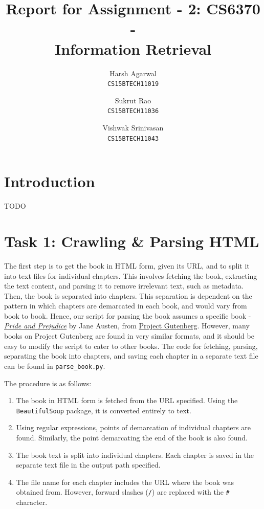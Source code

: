 \documentclass{article}
\title{Report for Assignment - 2: CS6370 - \\Information Retrieval}
\author{
Harsh Agarwal\\\texttt{CS15BTECH11019}
\and
Sukrut Rao\\\texttt{CS15BTECH11036}
\and
Vishwak Srinivasan\\\texttt{CS15BTECH11043}
}
\date{}
\begin{document}
\maketitle

\section{Introduction}
\begin{flushleft}
TODO
\end{flushleft}

\section{Task 1: Crawling \& Parsing HTML}
\begin{flushleft}
The first step is to get the book in HTML form, given its URL, and to split it into text files for individual chapters. This involves fetching the book, extracting the text content, and parsing it to remove irrelevant text, such as metadata. Then, the book is separated into chapters. This separation is dependent on the pattern in which chapters are demarcated in each book, and would vary from book to book. Hence, our script for parsing the book assumes a specific book - \textit{\href{https://www.gutenberg.org/files/1342/1342-h/1342-h.htm}{Pride and Prejudice}} by Jane Austen, from \href{https://www.gutenberg.org}{Project Gutenberg}. However, many books on Project Gutenberg are found in very similar formats, and it should be easy to modify the script to cater to other books. The code for fetching, parsing, separating the book into chapters, and saving each chapter in a separate text file can be found in \verb|parse_book.py|.

The procedure is as follows:
\begin{enumerate}
	\item The book in HTML form is fetched from the URL specified. Using the \verb|BeautifulSoup| package, it is converted entirely to text.
	\item Using regular expressions, points of demarcation of individual chapters are found. Similarly, the point demarcating the end of the book is also found.
	\item The book text is split into individual chapters. Each chapter is saved in the separate text file in the output path specified.
	\item The file name for each chapter includes the URL where the book was obtained from. However, forward slashes (\verb|/|) are replaced with the \verb|#| character.
\end{enumerate}


\end{flushleft}
\end{document}
